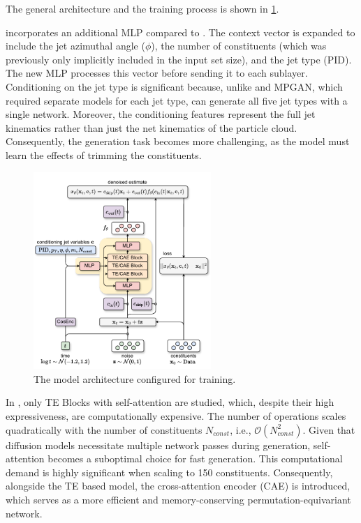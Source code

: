 The general \pcdroid architecture and the training process is shown in \cref{fig:droid_arch_train}.

\pcdroid incorporates an additional MLP compared to \pcjedi.
The context vector is expanded to include the jet azimuthal angle ($\phi$), the number of constituents (which was previously only implicitly included in the input set size), and the jet type (PID).
The new MLP processes this vector before sending it to each sublayer.
Conditioning on the jet type is significant because, unlike \pcjedi and MPGAN, which required separate models for each jet type, \pcdroid can generate all five jet types with a single network.
Moreover, the conditioning features represent the full jet kinematics rather than just the net kinematics of the particle cloud.
Consequently, the generation task becomes more challenging, as the model must learn the effects of trimming the constituents.

\begin{figure}[htpb]
    \centering
    \includegraphics[width=0.6\textwidth]{Figures/jet_generation/pcdroid.pdf}
    \caption{The \pcdroid model architecture configured for training.}
    \label{fig:droid_arch_train}
\end{figure}

In \pcjedi, only TE Blocks with self-attention are studied, which, despite their high expressiveness, are computationally expensive.
The number of operations scales quadratically with the number of constituents $N_{const}$, i.e., $\mathcal{O}(N_{const}^2)$.
Given that diffusion models necessitate multiple network passes during generation, self-attention becomes a suboptimal choice for fast generation.
This computational demand is highly significant when scaling to 150 constituents.
Consequently, alongside the TE based model, the cross-attention encoder (CAE) is introduced, which serves as a more efficient and memory-conserving permutation-equivariant network.

